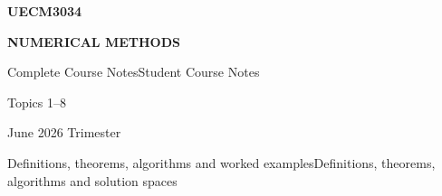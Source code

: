 \documentclass[12pt,a4paper]{report}
\begin{document}
\begin{titlepage}
\centering
\vspace*{1.8cm}
{\Huge\bfseries UECM3034\par}
\vspace{0.55cm}
{\Huge\bfseries NUMERICAL METHODS\par}
\vspace{1.7cm}
{\LARGE \ifshowsolutions Complete Course Notes\else Student Course Notes\fi\par}
\vspace{0.5cm}
{\Large Topics 1--8\par}
\vfill
{\Large June 2026 Trimester\par}
\vspace{1.1cm}
{\large \ifshowsolutions Definitions, theorems, algorithms and worked examples\else Definitions, theorems, algorithms and solution spaces\fi\par}
\vspace*{1.2cm}
\end{titlepage}

\tableofcontents
\clearpage
{}









\end{document}
